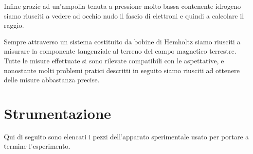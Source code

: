 \documentclass[a4paper,11pt]{article}
\begin{document}
	Infine grazie ad un'ampolla tenuta a pressione molto bassa contenente idrogeno siamo riusciti a vedere ad occhio nudo il fascio di elettroni e quindi a calcolare il raggio. 
	
	Sempre attraverso un sistema costituito da bobine di Hemholtz siamo riusciti a misurare la componente tangenziale al terreno del campo magnetico terrestre. Tutte le misure effettuate si sono rilevate compatibili con le aspettative, e nonostante molti problemi pratici descritti in seguito siamo riusciti ad ottenere delle misure abbastanza precise.
	
		\section{Strumentazione}
		
		Qui di seguito sono elencati i pezzi dell'apparato sperimentale usato per portare a termine l'esperimento.
\end{document}
